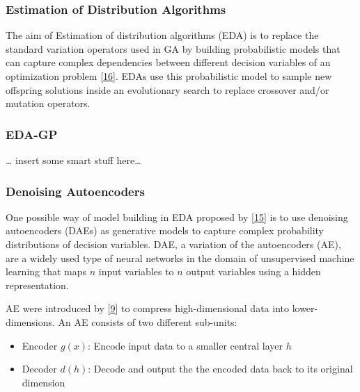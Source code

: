 \documentclass[
  11pt,
]{article}
\providecommand{\tightlist}{%
  \setlength{\itemsep}{0pt}\setlength{\parskip}{0pt}}
\begin{document}
\hypertarget{estimation-of-distribution-algorithms}{%
\subsubsection{Estimation of Distribution Algorithms}\label{estimation-of-distribution-algorithms}}

The aim of Estimation of distribution algorithms (EDA) is to replace the standard variation operators used in GA by building probabilistic models that can capture complex dependencies between different decision variables of an optimization problem {[}\protect\hyperlink{ref-design_of_modern_heuristics}{16}{]}.
EDAs use this probabilistic model to sample new offspring solutions inside an evolutionary search to replace crossover and/or mutation operators.

\hypertarget{eda-gp}{%
\subsubsection{EDA-GP}\label{eda-gp}}

\ldots{} insert some smart stuff here\ldots{}

\hypertarget{denoising-autoencoders}{%
\subsubsection{Denoising Autoencoders}\label{denoising-autoencoders}}

One possible way of model building in EDA proposed by {[}\protect\hyperlink{ref-harmless_overfitting_eda}{15}{]} is to use denoising autoencoders (DAEs) as generative models to capture complex probability distributions of decision variables.
DAE, a variation of the autoencoders (AE), are a widely used type of neural networks in the domain of unsupervised machine learning that maps \(n\) input variables to \(n\) output variables using a hidden representation.

AE were introduced by {[}\protect\hyperlink{ref-ae_orig}{9}{]} to compress high-dimensional data into lower-dimensions. An AE consists of two different sub-units:

\begin{itemize}
\tightlist
\item
  Encoder \(g(x)\): Encode input data to a smaller central layer \(h\)
\item
  Decoder \(d(h)\): Decode and output the the encoded data back to its original dimension
\end{itemize}
\end{document}
